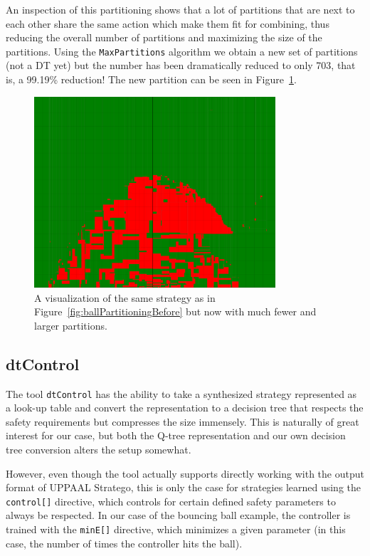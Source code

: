 \documentclass{article}
\begin{document}
An inspection of this partitioning shows that a lot of partitions that are next
to each other share the same action which make them fit for combining, thus
reducing the overall number of partitions and maximizing the size of the
partitions. Using the \texttt{MaxPartitions} algorithm we obtain a new set of
partitions (not a DT yet) but the number has been dramatically reduced to only
703, that is, a 99.19\% reduction! The new partition can be seen in
Figure~\ref{fig:ballPartitioningAfter}.

\begin{figure}[h]
    \centering
    \includegraphics[width=0.8\textwidth]{ballPartitioningAfter}
    \caption{%
        A visualization of the same strategy as in
        Figure~\ref{fig:ballPartitioningBefore} but now with much fewer and
        larger partitions.
    }\label{fig:ballPartitioningAfter}
\end{figure}




\subsection{dtControl}%
\label{subsec:dtControl}

The tool \texttt{dtControl} has the ability to take a synthesized strategy
represented as a look-up table and convert the representation to a decision
tree that respects the safety requirements but compresses the size immensely.
This is naturally of great interest for our case, but both the Q-tree
representation and our own decision tree conversion alters the setup somewhat.

However, even though the tool actually supports directly working with the output
format of UPPAAL Stratego, this is only the case for strategies learned using
the \texttt{control[]} directive, which controls for certain defined safety
parameters to always be respected. In our case of the bouncing ball example, the
controller is trained with the \texttt{minE[]} directive, which minimizes a
given parameter (in this case, the number of times the controller hits the
ball).
\end{document}
